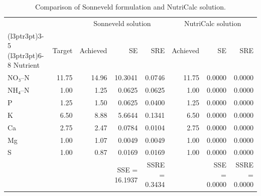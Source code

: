 \documentclass[
  letterpaper,
  DIV=11,
  numbers=noendperiod]{scrreprt}
\begin{document}
\vspace{1.5\baselineskip}
\begingroup\fontsize{9}{11}\selectfont

\begin{longtable}[t]{lrrrrrrr}

\caption{\label{tbl-sonneveld-vs-nutricalc}Comparison of Sonneveld
formulation and NutriCalc solution.}

\tabularnewline

\\
\toprule
\multicolumn{2}{c}{ } & \multicolumn{3}{c}{Sonneveld solution} & \multicolumn{3}{c}{NutriCalc solution} \\
\cmidrule(l{3pt}r{3pt}){3-5} \cmidrule(l{3pt}r{3pt}){6-8}
Nutrient & Target & Achieved & SE & SRE & Achieved & SE & SRE\\
\midrule
NO₃–N & 11.75 & 14.96 & 10.3041 & 0.0746 & 11.75 & 0.0000 & 0.0000\\
NH₄–N & 1.00 & 1.25 & 0.0625 & 0.0625 & 1.00 & 0.0000 & 0.0000\\
P & 1.25 & 1.50 & 0.0625 & 0.0400 & 1.25 & 0.0000 & 0.0000\\
K & 6.50 & 8.88 & 5.6644 & 0.1341 & 6.50 & 0.0000 & 0.0000\\
Ca & 2.75 & 2.47 & 0.0784 & 0.0104 & 2.75 & 0.0000 & 0.0000\\
\addlinespace
Mg & 1.00 & 1.07 & 0.0049 & 0.0049 & 1.00 & 0.0000 & 0.0000\\
S & 1.00 & 0.87 & 0.0169 & 0.0169 & 1.00 & 0.0000 & 0.0000\\
 &  &  & SSE = 16.1937 & SSRE = 0.3434 &  & SSE = 0.0000 & SSRE = 0.0000\\
\bottomrule

\end{longtable}

\endgroup{}

\vspace{1.5\baselineskip}
\begingroup\fontsize{9}{11}\selectfont
\end{document}
